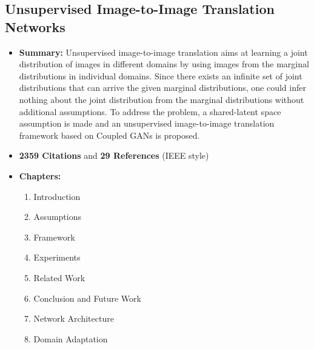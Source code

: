 \documentclass[11pt]{article}
\begin{document}
    \subsection{Unsupervised Image-to-Image Translation Networks \cite{DBLP:journals/corr/LiuBK17}}
    \begin{itemize}
        \item \textbf{Summary:} Unsupervised image-to-image translation aims at learning a joint distribution of
            images in different domains by using images from the marginal distributions in
            individual domains. Since there exists an infinite set of joint distributions that
            can arrive the given marginal distributions, one could infer nothing about the joint
            distribution from the marginal distributions without additional assumptions. To
            address the problem, a shared-latent space assumption is made and an
            unsupervised image-to-image translation framework based on Coupled GANs is proposed.
        \item \textbf{2359 Citations} and \textbf{29 References} (IEEE style)
        \item \textbf{Chapters:}
            \begin{enumerate}
                \item Introduction
                \item Assumptions 
                \item Framework
                \item Experiments
                \item Related Work 
                \item Conclusion and Future Work 
                \item Network Architecture
                \item Domain Adaptation
            \end{enumerate}
    \end{itemize}
\end{document}
